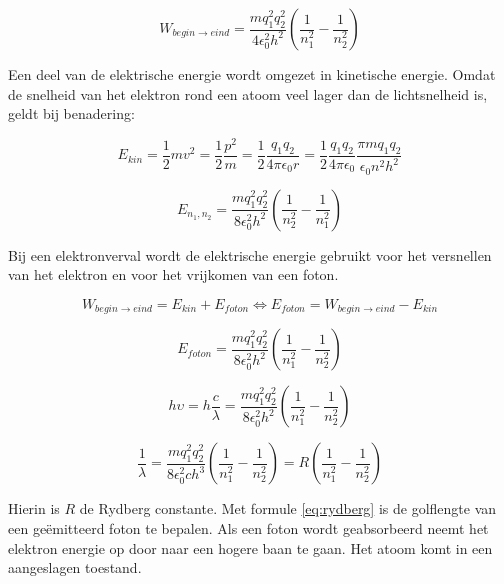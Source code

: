 \begin{equation}
W_{begin\rightarrow eind}
=\frac{mq_{1}^{2}q_{2}^{2}}{4\epsilon_{0}^{2}h^{2}}(\frac{1}{n_{1}^{2}}-\frac{1}{n_{2}^{2}})
\end{equation}


Een deel van de elektrische energie wordt omgezet in kinetische energie.
Omdat de snelheid van het elektron rond een atoom veel lager dan de
lichtsnelheid is, geldt bij benadering:

\begin{equation}
E_{kin}
=\frac{1}{2}mv^{2}
=\frac{1}{2}\frac{p^{2}}{m}
=\frac{1}{2}\frac{q_{1}q_{2}}{4\pi\epsilon_{0}r}
=\frac{1}{2}\frac{q_{1}q_{2}}{4\pi\epsilon_{0}}\frac{\pi mq_{1}q_{2}}{\epsilon_{0}n^{2}h^{2}}
\end{equation}

\begin{equation}
E_{n_{1},n_{2}}=\frac{mq_{1}^{2}q_{2}^{2}}{8\epsilon_{0}^{2}h^{2}}(\frac{1}{n_{2}^{2}}-\frac{1}{n_{1}^{2}})
\end{equation}


Bij een elektronverval wordt de elektrische energie gebruikt voor
het versnellen van het elektron en voor het vrijkomen van een foton.

\begin{equation}
W_{begin\rightarrow eind}=E_{kin}+E_{foton}
\Longleftrightarrow E_{foton}=W_{begin\rightarrow eind}-E_{kin}
\end{equation}


\begin{equation}
E_{foton}
=\frac{mq_{1}^{2}q_{2}^{2}}{8\epsilon_{0}^{2}h^{2}}(\frac{1}{n_{1}^{2}}-\frac{1}{n_{2}^{2}})
\end{equation}


\begin{equation}
h\upsilon=h\frac{c}{\lambda}
=\frac{mq_{1}^{2}q_{2}^{2}}{8\epsilon_{0}^{2}h^{2}}(\frac{1}{n_{1}^{2}}-\frac{1}{n_{2}^{2}})
\end{equation}


\begin{equation} \label{eq:rydberg}
\frac{1}{\lambda}
=\frac{mq_{1}^{2}q_{2}^{2}}{8\epsilon_{0}^{2}ch^{3}}(\frac{1}{n_{1}^{2}}-\frac{1}{n_{2}^{2}})
=R(\frac{1}{n_{1}^{2}}-\frac{1}{n_{2}^{2}})
\end{equation}


Hierin is $R$ de Rydberg constante. Met formule \ref{eq:rydberg}
is de golflengte van een geëmitteerd foton te bepalen. Als een foton
wordt geabsorbeerd neemt het elektron energie op door naar een hogere
baan te gaan. Het atoom komt in een aangeslagen toestand.


